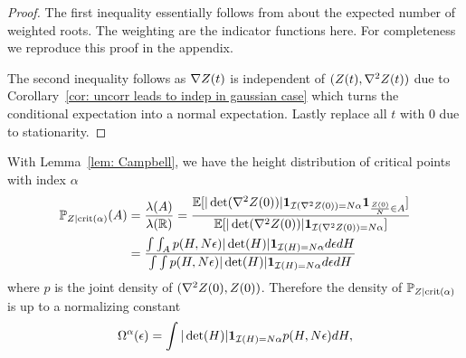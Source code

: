 \begin{proof}
	The first inequality essentially follows from \textcite[Theorem 6.4]{azaisLevelSetsExtrema2009}
	about the expected number of weighted roots. The weighting are the indicator
	functions here. For completeness we reproduce this proof in the appendix.

	The second inequality follows as \(\nabla Z(t)\) is independent of
	\((Z(t),\nabla^2Z(t))\) due to Corollary~\ref{cor: uncorr leads to indep
	in gaussian case} which turns the conditional expectation into a normal
	expectation. Lastly replace all \(t\) with \(0\) due to stationarity.
\end{proof}

\begin{corollary}
	 With Lemma~\ref{lem: Campbell},
	we have the height distribution of critical points with index \(\alpha\)
	\begin{align*}
		\mathbb{P}_{Z\mid \text{crit}(\alpha)}(A)
		&= \frac{\lambda(A)}{\lambda(\mathbb{R})}
		= \frac{
			\mathbb{E}[|\det(\nabla^2 Z(0))|
			\mathbf{1}_{\mathcal{I}(\nabla^2Z(0))=N\alpha}
			\mathbf{1}_{\frac{Z(0)}{N} \in A}
			]
		}{
			\mathbb{E}[|\det(\nabla^2 Z(0))|\mathbf{1}_{\mathcal{I}(\nabla^2Z(0))=N\alpha}]
		}\\
		&= \frac{
			\int \int_A p(H, N \epsilon) |\det(H)|
			\mathbf{1}_{\mathcal{I}(H)=N\alpha}d\epsilon dH
		}{
			\int \int p(H, N \epsilon) |\det(H)|
			\mathbf{1}_{\mathcal{I}(H)=N\alpha}d\epsilon dH
		}
	\end{align*}
	where \(p\) is the joint density of \((\nabla^2 Z(0), Z(0))\). Therefore
	the density of \(\mathbb{P}_{Z\mid\text{crit}(\alpha)}\) is up to a normalizing
	constant
	\begin{equation*}
		\Omega^\alpha(\epsilon)
		= \int |\det(H)| \mathbf{1}_{\mathcal{I}(H) = N\alpha} p(H, N\epsilon)dH,
	\end{equation*}
\end{corollary}